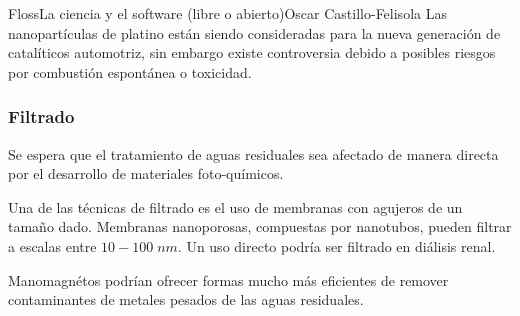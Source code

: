 \begin{article}[2]{Floss}{La ciencia y el software (libre o abierto)}{Oscar Castillo-Felisola}
Las nanopart\'iculas de platino est\'an siendo consideradas para la nueva generaci\'on de catal\'iticos automotriz, sin embargo existe controversia debido a posibles riesgos por combusti\'on espont\'anea o toxicidad.

\subsubsection*{Filtrado}

Se espera que el tratamiento de aguas residuales sea afectado de manera directa por el desarrollo de materiales foto-qu\'imicos.

Una de las t\'ecnicas de filtrado es el uso de membranas con agujeros de un tama\~no dado.  Membranas nanoporosas, compuestas por nanotubos, pueden filtrar a escalas entre $10-100\;nm$. Un uso directo podr\'ia ser filtrado en di\'alisis renal.

Manomagn\'etos podr\'ian ofrecer formas mucho m\'as eficientes de remover contaminantes de metales pesados de las aguas residuales.




\begin{Quellen}
\end{Quellen}

\nocite{Castillo-Felisola:2015nma,Castillo-Felisola:2015ema,Castillo-Felisola:2014xba,Castillo-Felisola:2014iia}
\putbib[References]

\end{article}
